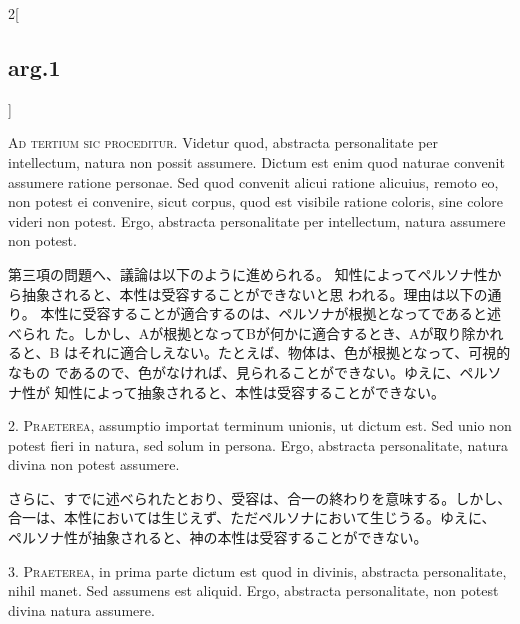 \documentclass[paper=a4paper,fontsize=10pt,jafontsize=9pt,titlepage]{jlreq}
\begin{document}
\begin{paracol}{2}[\subsection{arg.1}]

{\Huge A}{\scshape d tertium sic proceditur}. Videtur quod, abstracta personalitate per
intellectum, natura non possit assumere. Dictum est enim quod naturae
convenit assumere ratione personae. Sed quod convenit alicui ratione
alicuius, remoto eo, non potest ei convenire, sicut corpus, quod est
visibile ratione coloris, sine colore videri non potest. Ergo, abstracta
personalitate per intellectum, natura assumere non potest.

\switchcolumn

第三項の問題へ、議論は以下のように進められる。
知性によってペルソナ性から抽象されると、本性は受容することができないと思
 われる。理由は以下の通り。
本性に受容することが適合するのは、ペルソナが根拠となってであると述べられ
 た。しかし、Aが根拠となってBが何かに適合するとき、Aが取り除かれると、B
 はそれに適合しえない。たとえば、物体は、色が根拠となって、可視的なもの
 であるので、色がなければ、見られることができない。ゆえに、ペルソナ性が
 知性によって抽象されると、本性は受容することができない。


2. {\scshape Praeterea}, assumptio importat terminum unionis, ut dictum est. Sed unio
non potest fieri in natura, sed solum in persona. Ergo, abstracta
personalitate, natura divina non potest assumere.

\switchcolumn

さらに、すでに述べられたとおり、受容は、合一の終わりを意味する。しかし、
 合一は、本性においては生じえず、ただペルソナにおいて生じうる。ゆえに、
 ペルソナ性が抽象されると、神の本性は受容することができない。


3. {\scshape Praeterea}, in prima parte dictum est quod in divinis, abstracta
personalitate, nihil manet. Sed assumens est aliquid. Ergo, abstracta
personalitate, non potest divina natura assumere.

\switchcolumn


\end{paracol}
\end{document}
